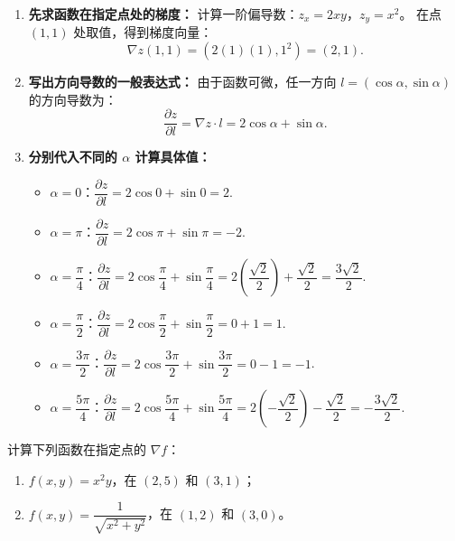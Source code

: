 \documentclass[lang=cn,11pt]{elegantbook}
\begin{document}
\begin{solution}
\begin{enumerate}
  \item \textbf{先求函数在指定点处的梯度：}
  计算一阶偏导数：$z_x = 2xy$，$z_y = x^2$。
  在点 $(1,1)$ 处取值，得到梯度向量：
  \[ \nabla z(1,1) = (2(1)(1), 1^2) = (2, 1). \]
  
  \item \textbf{写出方向导数的一般表达式：}
  由于函数可微，任一方向 $l=(\cos\alpha, \sin\alpha)$ 的方向导数为：
  \[ \frac{\partial z}{\partial l} = \nabla z \cdot l = 2\cos\alpha + \sin\alpha. \]

  \item \textbf{分别代入不同的 $\alpha$ 计算具体值：}
  \begin{itemize}
    \item[(1)] $\alpha=0$：$\dfrac{\partial z}{\partial l} = 2\cos 0 + \sin 0 = 2$.
    \item[(2)] $\alpha=\pi$：$\dfrac{\partial z}{\partial l} = 2\cos\pi + \sin\pi = -2$.
    \item[(3)] $\alpha=\dfrac{\pi}{4}$：$\dfrac{\partial z}{\partial l} = 2\cos\dfrac{\pi}{4} + \sin\dfrac{\pi}{4} = 2\left(\dfrac{\sqrt{2}}{2}\right) + \dfrac{\sqrt{2}}{2} = \dfrac{3\sqrt{2}}{2}$.
    \item[(4)] $\alpha=\dfrac{\pi}{2}$：$\dfrac{\partial z}{\partial l} = 2\cos\dfrac{\pi}{2} + \sin\dfrac{\pi}{2} = 0 + 1 = 1$.
    \item[(5)] $\alpha=\dfrac{3\pi}{2}$：$\dfrac{\partial z}{\partial l} = 2\cos\dfrac{3\pi}{2} + \sin\dfrac{3\pi}{2} = 0 - 1 = -1$.
    \item[(6)] $\alpha=\dfrac{5\pi}{4}$：$\dfrac{\partial z}{\partial l} = 2\cos\dfrac{5\pi}{4} + \sin\dfrac{5\pi}{4} = 2\left(-\dfrac{\sqrt{2}}{2}\right) - \dfrac{\sqrt{2}}{2} = -\dfrac{3\sqrt{2}}{2}$.
  \end{itemize}
\end{enumerate}
\end{solution}

\begin{exercise}[计算具体点的梯度]
计算下列函数在指定点的 $\nabla f$：
\begin{enumerate}
  \item[(1)] $f(x,y)=x^2y$，在 $(2,5)$ 和 $(3,1)$；
  \item[(2)] $f(x,y)=\dfrac{1}{\sqrt{x^2+y^2}}$，在 $(1,2)$ 和 $(3,0)$。
\end{enumerate}
\end{exercise}
\end{document}

